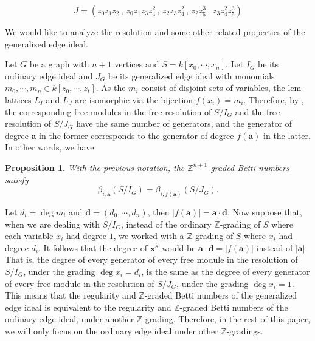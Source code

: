 \documentclass[dvipsnames,10pt]{article}
\newtheorem{proposition}[theorem]{Proposition}
\begin{document}
\begin{center}
\begin{equation*}
    J=(z_0z_1z_2\,,\,z_0z_1z_3z_4^2\,,\,z_2z_3z_4^2\,,\,z_2z_5^3\,,\,z_3z_4^2z_5^3)
\end{equation*}
\end{center}

We would like to analyze the resolution and some other related properties of the generalized edge ideal. 

Let $G$ be a graph with $n+1$ vertices and $S=k[x_0,\cdots,x_n]$. Let $I_G$ be its ordinary edge ideal and $J_G$ be its generalized edge ideal with monomials $m_0,\cdots,m_n\in k[z_0,\cdots,z_t]$. As the $m_i$ consist of disjoint sets of variables, the lcm-lattices $L_I$ and $L_J$ are isomorphic via the bijection $f(x_i)=m_i$. Therefore, by , the corresponding free modules in the free resolution of $S/I_G$ and the free resolution of $S/J_G$ have the same number of generators, and the generator of degree $\mathbf{a}$ in the former corresponds to the generator of degree $f(\mathbf{a})$ in the latter. In other words, we have

\begin{proposition}
    With the previous notation, the $\mathbb{Z}^{n+1}$-graded Betti numbers satisfy
    \begin{equation*}
        \beta_{i,\mathbf{a}}(S/I_G) = \beta_{i,f(\mathbf{a})}(S/J_G).
    \end{equation*}
\end{proposition}

Let $d_i=\deg m_i$ and $\mathbf{d}=(d_0,\cdots,d_n)$, then $|f(\mathbf{a})|=\mathbf{a}\cdot \mathbf{d}$. Now suppose that, when we are dealing with $S/I_G$, instead of the ordinary $\mathbb{Z}$-grading of $S$ where each variable $x_i$ had degree $1$, we worked with a $\mathbb{Z}$-grading of $S$ where $x_i$ had degree $d_i$. It follows that the degree of $\mathbf{x}^\mathbf{a}$ would be $\mathbf{a}\cdot \mathbf{d}=|f(\mathbf{a})|$ instead of $|\mathbf{a}|$. That is, the degree of every generator of every free module in the resolution of $S/I_G$, under the grading $\deg x_i=d_i$, is the same as the degree of every generator of every free module in the resolution of $S/J_G$, under the grading $\deg x_i=1$. This means that the regularity and $\mathbb{Z}$-graded Betti numbers of the generalized edge ideal is equivalent to the regularity and $\mathbb{Z}$-graded Betti numbers of the ordinary edge ideal, under another $\mathbb{Z}$-grading. Therefore, in the rest of this paper, we will only focus on the ordinary edge ideal under other $\mathbb{Z}$-gradings.
\end{document}
